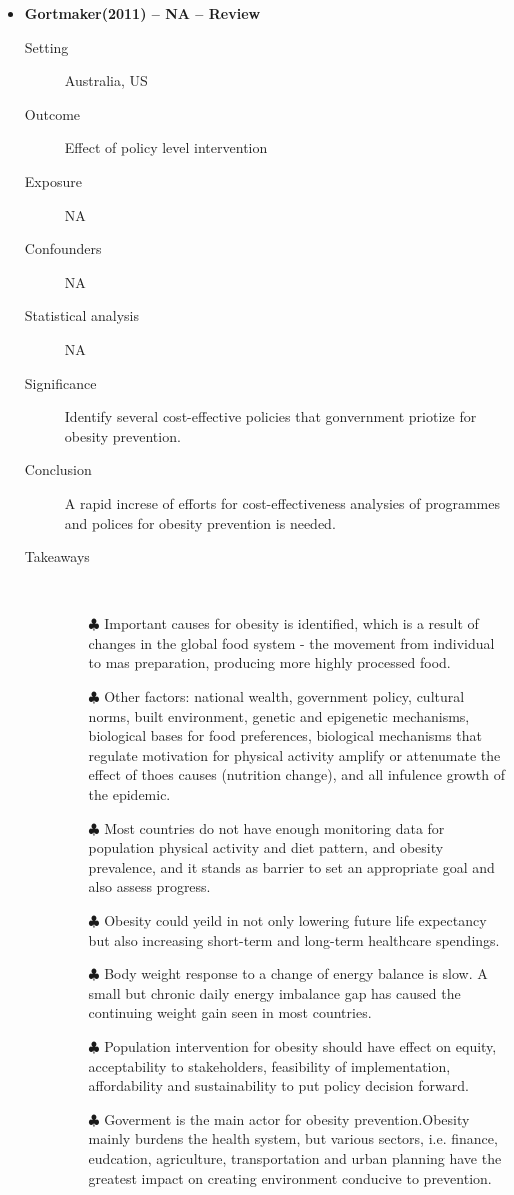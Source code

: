 \documentclass{article}
\begin{document}
\begin{itemize}
\newpage
\item{\bf Gortmaker(2011) -- NA  -- Review} 
		\begin{description}
			\item[Setting] Australia, US 
			\item[Outcome] Effect of policy level intervention 
			\item[Exposure] NA
			\item[Confounders] NA
			\item[Statistical analysis] NA
			\item[Significance] Identify several cost-effective policies that gonvernment priotize for obesity prevention. 
			\item[Conclusion] A rapid increse of efforts for cost-effectiveness analysies of programmes and polices for obesity prevention is needed. 
			\item[Takeaways] \mbox{}\\
				\begin{itemize}
					\item[$\clubsuit$] Important causes for obesity is identified, which is a result of changes in the global food system - the movement from individual to mas preparation, producing more highly processed food.   
					\item[$\clubsuit$] Other factors: national wealth, government policy, cultural norms, built environment, genetic and epigenetic mechanisms, biological bases for food preferences, biological mechanisms that regulate motivation for physical activity amplify or attenumate the effect of thoes causes (nutrition change), and all infulence growth of the epidemic. 
					\item[$\clubsuit$] Most countries do not have enough monitoring data for population physical activity and diet pattern, and obesity prevalence, and it stands as barrier to set an appropriate goal and also assess progress. 
					\item[$\clubsuit$] Obesity could yeild in not only lowering future life expectancy but also increasing short-term and long-term healthcare spendings.
					\item[$\clubsuit$] Body weight response to a change of energy balance is slow. A small but chronic daily energy imbalance gap has caused the continuing weight gain seen in most countries.
					\item[$\clubsuit$] Population intervention for obesity should have effect on equity, acceptability to stakeholders, feasibility of implementation, affordability and sustainability to put policy decision forward. 
					\item[$\clubsuit$] Goverment is the main actor for obesity prevention.Obesity mainly burdens the health system, but various sectors, i.e. finance, eudcation, agriculture, transportation and urban planning have the greatest impact on creating environment conducive to prevention. 


\end{itemize}
\end{description}
\end{itemize}
\end{document}
